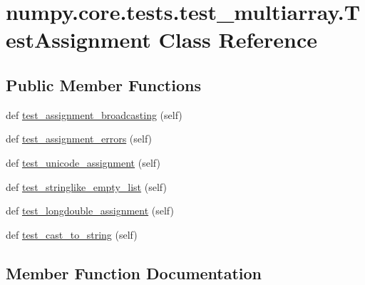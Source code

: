\hypertarget{classnumpy_1_1core_1_1tests_1_1test__multiarray_1_1TestAssignment}{}\section{numpy.\+core.\+tests.\+test\+\_\+multiarray.\+Test\+Assignment Class Reference}
\label{classnumpy_1_1core_1_1tests_1_1test__multiarray_1_1TestAssignment}
\subsection*{Public Member Functions}
\begin{DoxyCompactItemize}
\item 
def \hyperlink{classnumpy_1_1core_1_1tests_1_1test__multiarray_1_1TestAssignment_a882eda98bd77b25746fb6aa70d166b36}{test\+\_\+assignment\+\_\+broadcasting} (self)
\item 
def \hyperlink{classnumpy_1_1core_1_1tests_1_1test__multiarray_1_1TestAssignment_a2a2656d86c16d11b8ac8d8f35351435d}{test\+\_\+assignment\+\_\+errors} (self)
\item 
def \hyperlink{classnumpy_1_1core_1_1tests_1_1test__multiarray_1_1TestAssignment_a3bf7cc70764b59cf1f84950f66afecaa}{test\+\_\+unicode\+\_\+assignment} (self)
\item 
def \hyperlink{classnumpy_1_1core_1_1tests_1_1test__multiarray_1_1TestAssignment_aeb441171b0905d0d33bf07bf6aa88a66}{test\+\_\+stringlike\+\_\+empty\+\_\+list} (self)
\item 
def \hyperlink{classnumpy_1_1core_1_1tests_1_1test__multiarray_1_1TestAssignment_ae64db2e8f9441c9bea0a4a2eb279de05}{test\+\_\+longdouble\+\_\+assignment} (self)
\item 
def \hyperlink{classnumpy_1_1core_1_1tests_1_1test__multiarray_1_1TestAssignment_a81326cc9617631a305c20c0e377abfd5}{test\+\_\+cast\+\_\+to\+\_\+string} (self)
\end{DoxyCompactItemize}


\subsection{Member Function Documentation}
\mbox{\label{classnumpy_1_1core_1_1tests_1_1test__multiarray_1_1TestAssignment_a882eda98bd77b25746fb6aa70d166b36}} 
